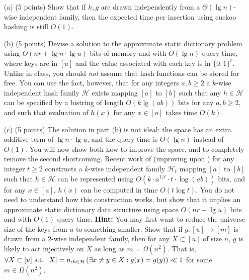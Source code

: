 \documentclass[12pt]{article}
\let\Pr\relax
\DeclareMathOperator*{\Pr}{\mathbb{P}}
\begin{document}
\begin{itemize}
\item[(a)] (5 points) Show that if $h,g$ are drawn independently from a $\Theta(\lg n)$-wise independent family, then the expected time per insertion using cuckoo hashing is still $O(1)$.
\item[(b)] (5 points) Devise a solution to the approximate static dictionary problem using $O(nr + \lg n\cdot\lg u)$ bits of memory and with $O(\lg n)$ query time, where keys are in $[u]$ and the value associated with each key is in $\{0,1\}^r$. Unlike in class, you should {\em not} assume that hash functions can be stored for free. You can use the fact, however, that for any integers $a,b\ge 2$ a $k$-wise independent hash family $\mathcal{H}$ exists mapping $[a]$ to $[b]$ such that any $h\in\mathcal{H}$ can be specified by a bistring of length $O(k\lg(ab))$ bits for any $a,b\ge 2$, and such that evaluation of $h(x)$ for any $x\in[a]$ takes time $O(k)$.
\item[(c)] (5 points) The solution in part (b) is not ideal: the space has an extra additive term of $\lg n\cdot \lg u$, and the query time is $O(\lg n)$ instead of $O(1)$. You will now show both how to improve the space, and to completely remove the second shortcoming. Recent work of \cite{ChristianiPT15} (improving upon \cite{Siegel04,Thorup13}) for any integer $t\ge 2$ constructs a $k$-wise independent family $\mathcal{H}_t$ mapping $[a]$ to $[b]$ such that $h\in\mathcal{H}$ can be represented using $O(k \cdot a^{1/t}\cdot t\cdot\log(ab))$ bits, and for any $x\in[a]$, $h(x)$ can be computed in time $O(t\log t)$. You do not need to understand how this construction works, but show that it implies an approximate static dictionary data structure using space $O(nr + \lg u)$ bits and with $O(1)$ query time. \textbf{Hint:} You may first want to reduce the universe size of the keys from $u$ to something smaller. Show that if $g:[u]\rightarrow[m]$ is drawn from a $2$-wise independent family, then for any $X\subset[u]$ of size $n$, $g$ is likely to act injectively on $X$ as long as $m = \Omega(n^2)$. That is, $\forall X\subset[u]\text{ s.t. }  |X| = n, \Pr_{h\in\mathcal{H}}(\exists x\neq y \in X : g(x) = g(y)) \ll 1$ for some $m \in \Omega(n^2)$.
\end{itemize}
\end{document}
